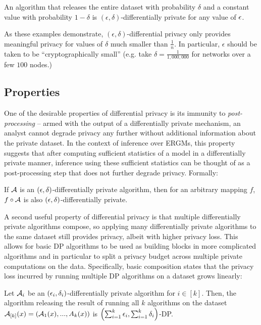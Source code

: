 \begin{example}
	An algorithm that releases the entire dataset with probability $\delta$ and a constant value with probability $1-\delta$ is $(\epsilon, \delta)$-differentially private for any value of $\epsilon$.
\end{example}
As these examples demonstrate, $(\epsilon, \delta)$-differential privacy only provides meaningful privacy for values of $\delta$ much smaller than $\frac{1}{n}$. In particular, $\epsilon$ should be taken to be ``cryptographically small'' (e.g.  take $\delta = \frac{1}{1,000,000}$ for networks over a few $100$ nodes.)

\subsection*{Properties}

One of the desirable properties of differential privacy is its immunity to \emph{post-processing} -- armed with the output of a differentially private mechanism, an analyst cannot degrade privacy any further without additional information about the private dataset. In the context of inference over ERGMs, this property suggests that after computing sufficient statistics of a model in a differentially private manner, inference using these sufficient statistics can be thought of as a post-processing step that does not further degrade privacy. Formally: 
	\begin{property}
		If $\mathcal{A}$ is an $(\epsilon, \delta)$-differentially private algorithm, then for an arbitrary mapping $f$,  $f \circ \mathcal{A}$ is also $(\epsilon, \delta)$-differentially private. 	
	\end{property}

A second useful property of differential privacy is that multiple differentially private algorithms compose, so applying many differentially private algorithms to the same dataset still provides privacy, albeit with higher privacy loss. This allows for basic DP algorithms to be used as building blocks in more complicated algorithms and in particular to split a privacy budget across multiple private computations on the data. Specifically, basic composition states that the privacy loss incurred by running multiple DP algorithms on a dataset grows linearly:
	\begin{property}
		Let $\mathcal{A}_i$ be an  $(\epsilon_i, \delta_i)$-differentially private algorithm for $i \in [k]$. Then, the algorithm releasing the result of running all $k$ algorithms on the dataset $\mathcal{A}_{[k]}(x) = (\mathcal{A}_1(x),...,A_k(x))$ is $\left(\sum_{i=1}^k \epsilon_i, \sum_{i=1}^k\delta_i\right)$-DP.
	\end{property}



